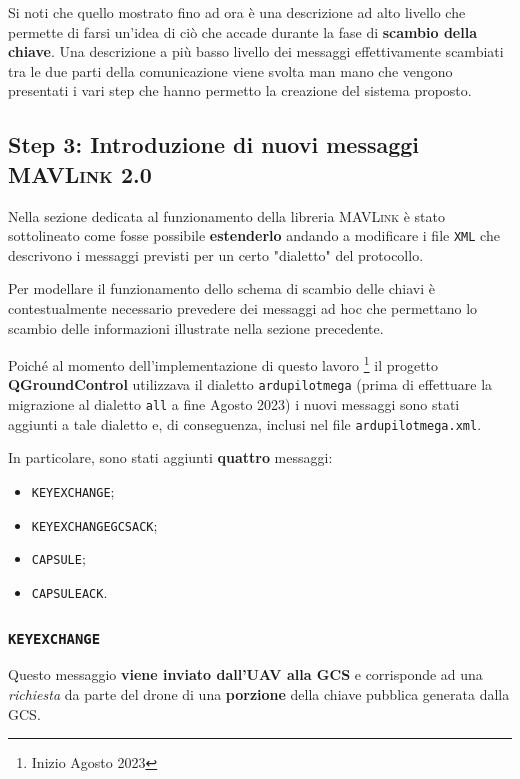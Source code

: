 \documentclass[a4paper, 12pt, oneside]{article}
\theoremstyle{definition}
\begin{document}
Si noti che quello mostrato fino ad ora è una descrizione ad alto livello che permette di farsi un'idea di ciò che accade durante la fase di \textbf{scambio della chiave}. Una descrizione a più basso livello dei messaggi effettivamente scambiati tra le due parti della comunicazione viene svolta man mano che vengono presentati i vari step che hanno permetto la creazione del sistema proposto.

\newpage

\subsection{Step 3: Introduzione di nuovi messaggi \textsc{MAVLink} 2.0}
Nella sezione dedicata al funzionamento della libreria \textsc{MAVLink} è stato sottolineato come fosse possibile \textbf{estenderlo} andando a modificare i file \texttt{XML} che descrivono i messaggi previsti per un certo "dialetto" del protocollo.

Per modellare il funzionamento dello schema di scambio delle chiavi è contestualmente necessario prevedere dei messaggi ad hoc che permettano lo scambio delle informazioni illustrate nella sezione precedente.

Poiché al momento dell'implementazione di questo lavoro \footnote{Inizio Agosto 2023} il progetto \textbf{QGroundControl} utilizzava il dialetto \texttt{ardupilotmega} (prima di effettuare la migrazione al dialetto \texttt{all} a fine Agosto 2023) i nuovi messaggi sono stati aggiunti a tale dialetto e, di conseguenza, inclusi nel file \texttt{ardupilotmega.xml}.

In particolare, sono stati aggiunti \textbf{quattro} messaggi:

\begin{itemize}
    \item \texttt{KEYEXCHANGE};
    \item \texttt{KEYEXCHANGEGCSACK};
    \item \texttt{CAPSULE};
    \item \texttt{CAPSULEACK}.
\end{itemize}

\subsubsection{\texttt{KEYEXCHANGE}}
Questo messaggio \textbf{viene inviato dall'UAV alla GCS} e corrisponde ad una \textit{richiesta} da parte del drone di una \textbf{porzione} della chiave pubblica generata dalla GCS.
\end{document}
